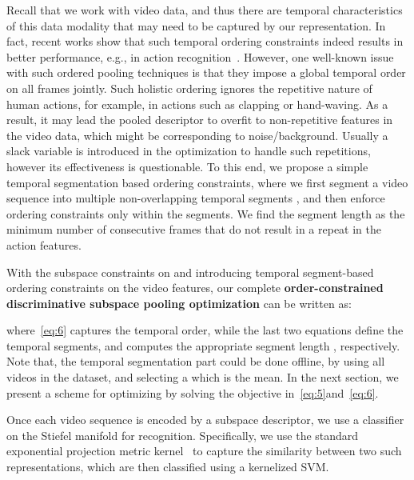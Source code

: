 \documentclass[runningheads]{llncs}
\begin{document}
Recall that we work with video data, and thus there are temporal characteristics of this data modality that may need to be captured by our representation. In fact, recent works show that such temporal ordering constraints indeed results in better performance, e.g., in action recognition~\cite{grp,fernando2015modeling,bilen2016dynamic,bilen2017action}.  However, one well-known issue with such ordered pooling techniques is that they impose a global temporal order on all frames jointly. Such holistic ordering ignores the repetitive nature of human actions, for example, in actions such as clapping or hand-waving. As a result, it may lead the pooled descriptor to overfit to non-repetitive features in the video data, which might be corresponding to noise/background. Usually a slack variable is introduced in the optimization to handle such repetitions, however its effectiveness is questionable. To this end, we propose a simple temporal segmentation based ordering constraints, where we first segment a video sequence into multiple non-overlapping temporal segments , and then enforce ordering constraints only within the segments. We find the segment length  as the minimum number of consecutive frames that do not result in a repeat in the action features.

With the subspace constraints on  and introducing temporal segment-based ordering constraints on the video features, our complete \textbf{order-constrained discriminative subspace pooling optimization} can be written as:

where~\eqref{eq:6} captures the temporal order, while the last two equations define the temporal segments, and computes the appropriate segment length , respectively. Note that, the temporal segmentation part could be done offline, by using all videos in the dataset, and selecting a  which is the mean. In the next section, we present a scheme for optimizing  by solving the objective in~\eqref{eq:5}and~\eqref{eq:6}. 

Once each video sequence is encoded by a subspace descriptor, we use a classifier on the Stiefel manifold for recognition. Specifically, we use the standard exponential projection metric kernel~\cite{grp,harandi2014expanding} to capture the similarity between two such representations, which are then classified using a kernelized SVM.
\end{document}
